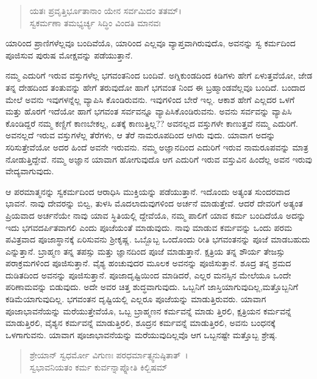 \begin{verse}
ಯತಃ ಪ್ರವೃತ್ತಿರ್ಭೂತಾನಾಂ ಯೇನ ಸರ್ವಮಿದಂ ತತಮ್​।\\ಸ್ವಕರ್ಮಣಾ ತಮಭ್ಯರ್ಚ್ಯ ಸಿದ್ಧಿಂ ವಿಂದತಿ ಮಾನವಃ 
\end{verse}

{\small ಯಾರಿಂದ ಪ್ರಾಣಿಗಳೆಲ್ಲವೂ ಬಂದಿವೆಯೊ, ಯಾರಿಂದ ಎಲ್ಲವೂ ವ್ಯಾಪ್ತವಾಗಿರುವುದೊ, ಅವನನ್ನು ಸ್ವ ಕರ್ಮದಿಂದ ಪೂಜಿಸುವ ಪುರುಷ ಮೋಕ್ಷವನ್ನು ಪಡೆಯುತ್ತಾನೆ.}

ನಮ್ಮ ಎದುರಿಗೆ ಇರುವ ವಸ್ತುಗಳೆಲ್ಲ ಭಗವಂತನಿಂದ ಬಂದಿವೆ. ಅಗ್ನಿಕುಂಡದಿಂದ ಕಿಡಿಗಳು ಹೇಗೆ ಏಳುತ್ತವೆಯೋ, ಜೇಡ ತನ್ನ ದೇಹದಿಂದ ತಂತುವನ್ನು ಹೇಗೆ ತರುವುದೋ ಹಾಗೆ ಭಗವಂತ ನಿಂದ ಈ ಬ್ರಹ್ಮಾಂಡವೆಲ್ಲವೂ ಬಂದಿದೆ. ಬಂದಾದ ಮೇಲೆ ಅವನು ಇವುಗಳನ್ನೆಲ್ಲ ವ್ಯಾಪಿಸಿ ಕೊಂಡಿರುವನು. ಇವುಗಳಿಂದ ಬೇರೆ ಇಲ್ಲ. ಆಕಾಶ ಹೇಗೆ ಎಲ್ಲದರ ಒಳಗೆ ಮತ್ತು ಹೊರಗೆ ಇದೆಯೋ ಹಾಗೆ ಭಗವಂತ ಸರ್ವವನ್ನೂ ವ್ಯಾಪಿಸಿಕೊಂಡಿರುವನು. ಅವನು ಸರ್ವವನ್ನು ವ್ಯಾಪಿಸಿ ಕೊಂಡಿದ್ದರೆ ನಮ್ಮ ಕಣ್ಣಿಗೆ ಕಾಣಬೇಕಲ್ಲ, ಏತಕ್ಕೆ ಕಾಣುತ್ತಿಲ್ಲ?? ಅವನಲ್ಲದ ವಸ್ತುಗಳೇ ಕಾಣುತ್ತವೆ ನಮ್ಮ ಎದುರಿಗೆ. ಅವನಲ್ಲದೆ ಇರುವ ವಸ್ತುಗಳೆಲ್ಲ ತೆರೆಗಳು, ಆ ತೆರೆ ನಾಮರೂಪದಿಂದ ಆಗಿರು ವುದು. ಯಾವಾಗ ಅದನ್ನು ಸರಿಸುತ್ತೇವೆಯೋ ಅದರ ಹಿಂದೆ ಅವನೇ ಇರುವನು. ನಮ್ಮ ಅಜ್ಞಾನದಿಂದ ಎದುರಿಗೆ ಇರುವ ನಾಮರೂಪವನ್ನು ಮಾತ್ರ ನೋಡುತ್ತಿದ್ದೇವೆ. ನಮ್ಮ ಅಜ್ಞಾನ ಯಾವಾಗ ಹೋಗುವುದೊ ಆಗ ಎದುರಿಗೆ ಇರುವ ವಸ್ತುವಿನ ಹಿಂದೆಲ್ಲ ಅವನ ಇರುವು ವೇದ್ಯವಾಗುವುದು.

ಆ ಪರಮಾತ್ಮನನ್ನು ಸ್ವಕರ್ಮದಿಂದ ಆರಾಧಿಸಿ ಮುಕ್ತಿಯನ್ನು ಪಡೆಯುತ್ತಾನೆ. ಇದೊಂದು ಅತ್ಯಂತ ಸುಂದರವಾದ ಭಾವನೆ. ನಾವು ದೇವರನ್ನು ಬಿಲ್ವ, ತುಳಸಿ ಮೊದಲಾದುವುಗಳಿಂದ ಅರ್ಚನೆ ಮಾಡುತ್ತೇವೆ. ಆದರೆ ದೇವರಿಗೆ ಅತ್ಯಂತ ಪ್ರಿಯವಾದ ಅರ್ಚನೆಯೇ ನಾವು ಯಾವ ಸ್ಥಿತಿಯಲ್ಲಿ ದ್ದೇವೆಯೊ, ನಮ್ಮ ಪಾಲಿಗೆ ಯಾವ ಕರ್ಮ ಬಂದಿದೆಯೊ ಅದನ್ನು ಇದು ಭಗವದರ್ಪಿತವಾಗಲಿ ಎಂದು ಪೂಜೆಯಂತೆ ಮಾಡುವುದು. ನಾವು ಮಾಡುವ ಕರ್ಮವನ್ನು ಒಂದು ಪರಮ ಪವಿತ್ರವಾದ ಪೂಜಾಸ್ಥಾನಕ್ಕೆ ಏರಿಸುವನು ಶ‍್ರೀಕೃಷ್ಣ. ಒಬ್ಬೊಬ್ಬ ಒಂದೊಂದು ರೀತಿ ಭಗವಂತನನ್ನು ಪೂಜೆ ಮಾಡಬಹುದು ಎನ್ನುತ್ತಾನೆ. ಬ್ರಾಹ್ಮಣ ತನ್ನ ತಪಸ್ಸು ಮತ್ತು ಜ್ಞಾನದಿಂದ ಪೂಜೆ ಮಾಡುತ್ತಾನೆ. ಕ್ಷತ್ರಿಯ ತನ್ನ ಶೌರ್ಯ ತೇಜಸ್ಸು ಪರಾಕ್ರಮಗಳಿಂದ ಪೂಜಿಸುತ್ತಾನೆ. ವೈಶ್ಯ ಹಂಚುವುದರ ಮೂಲಕ ಅವನನ್ನು ಪೂಜಿಸುತ್ತಾನೆ. ಶೂದ್ರ ತನ್ನ ಶ್ರಮದ ದುಡಿತದಿಂದ ಅವನನ್ನು ಪೂಜಿಸುತ್ತಾನೆ. ಪೂಜಾದೃಷ್ಟಿಯಿಂದ ಮಾಡಿದರೆ, ಎಲ್ಲರ ಮನಸ್ಸಿನ ಮೇಲೆಯೂ ಒಂದೇ ಪರಿಣಾಮವನ್ನು ಬಿಡುವುದು. ಅದೇ ಅವರ ಚಿತ್ತ ಶುದ್ಧವಾಗುವುದು. ಒಬ್ಬನಿಗೆ ಜಾಸ್ತಿಯಾಗುವುದಿಲ್ಲ,ಮತ್ತೊಬ್ಬನಿಗೆ ಕಡಿಮೆಯಾಗುವುದಿಲ್ಲ. ಭಗವಂತನ ದೃಷ್ಟಿಯಲ್ಲಿ ಎಲ್ಲರೂ ಪೂಜೆಯನ್ನು ಮಾಡುತ್ತಿರುವರು. ಯಾವಾಗ ಪೂಜಾಭಾವನೆಯನ್ನು ಮರೆಯುತ್ತೇವೆಯೊ, ಒಬ್ಬ ಬ್ರಾಹ್ಮಣನ ಕರ್ಮವನ್ನೆ ಮಾಡು ತ್ತಿರಲಿ, ಕ್ಷತ್ರಿಯನ ಕರ್ಮವನ್ನೆ ಮಾಡುತ್ತಿರಲಿ, ವೈಶ್ಯನ ಕರ್ಮವನ್ನೆ ಮಾಡುತ್ತಿರಲಿ, ಶೂದ್ರನ ಕರ್ಮವನ್ನೆ ಮಾಡುತ್ತಿರಲಿ, ಅವನು ಬಂಧನಕ್ಕೆ ಒಳಗಾಗುವನು. ಯಾವಾಗ ಪೂಜಾಭಾವನೆಯನ್ನು ಮರೆಯುವುದಿಲ್ಲವೊ ಆಗ ಒಬ್ಬನಷ್ಟೇ ಮತ್ತೊಬ್ಬ ಶ್ರೇಷ್ಠ.

\begin{verse}
ಶ್ರೇಯಾನ್ ಸ್ವಧರ್ಮೋ ವಿಗುಣಃ ಪರಧರ್ಮಾತ್ಸ್ವನುಷ್ಠಿತಾತ್~।\\ಸ್ವಭಾವನಿಯತಂ ಕರ್ಮ ಕುರ್ವನ್ನಾಪ್ನೋತಿ ಕಿಲ್ಬಿಷಮ್ 
\end{verse}

